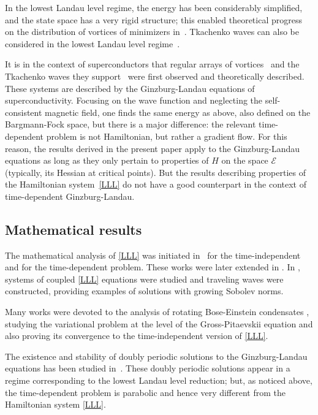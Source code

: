 \documentclass[JEP,XML,SOM,Unicode,NoFloatCountersInSection,published]{cedram}
\theoremstyle{definition}
\begin{document}
In the lowest Landau level regime, the energy has been considerably simplified, and the state space has a very rigid structure; this enabled theoretical progress on the distribution of vortices of minimizers in~\cite{ABD,Ho,WBP}. Tkachenko waves can also be considered in the lowest Landau level regime~\cite{Baym,Sonin}.

It is in the context of superconductors that regular arrays of vortices~\cite{Abrikosov} and the Tkachenko waves they support~\cite{Tkachenko} were first observed and theoretically described. These systems are described by the Ginzburg-Landau equations of superconductivity.
Focusing on the wave function and neglecting the self-consistent magnetic field, one finds the same energy as above, also defined on the Bargmann-Fock space, but there is a major difference: the relevant time-dependent problem is not Hamiltonian, but rather a gradient flow.
For this reason, the results derived in the present paper apply to the Ginzburg-Landau equations as long as they only pertain to properties of $H$ on the space $\mathcal{E}$ (typically, its Hessian at critical points). But the results describing properties of the Hamiltonian system~\eqref{LLL} do not have a good counterpart in the context of time-dependent Ginzburg-Landau.\enlargethispage{.5\baselineskip}%

\subsection{Mathematical results}

The mathematical analysis of \eqref{LLL} was initiated in~\cite{ABN} for the time-independent and \cite{Nier1} for the time-dependent problem. These works were later extended in \cite{GGT, Sch}. In \cite{SchTho, Tho1}, systems of coupled \eqref{LLL} equations were studied and traveling waves were constructed, providing examples of solutions with growing Sobolev norms.

Many works were devoted to the analysis of rotating Bose-Einstein condensates \cite{AB,BR,Rou2,Rou1,RSY2}, studying the variational problem at the level of the Gross-Pitaevskii equation and also proving its convergence to the time-independent version of \eqref{LLL}.

The existence and stability of doubly periodic solutions to the Ginzburg-Landau equations has been studied in~\cite{Sigal-Tza1, Sigal-Tza2, Sigal-Tza3}. These doubly periodic solutions appear in a regime corresponding to the lowest Landau level reduction; but, as noticed above, the time-dependent problem is parabolic and hence very different from the Hamiltonian system \eqref{LLL}.
\end{document}
